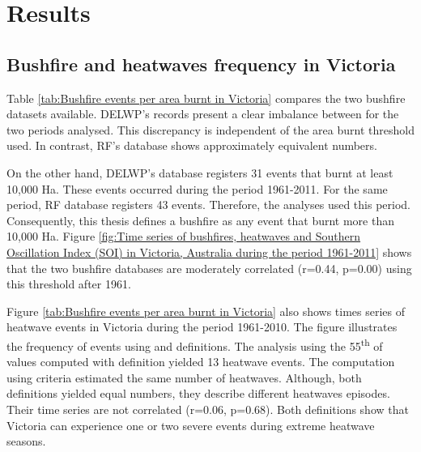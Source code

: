\section{Results}


\subsection{Bushfire and heatwaves frequency in Victoria}

Table \ref{tab:Bushfire events per area burnt in Victoria} compares
the two bushfire datasets available. DELWP's records present a clear
imbalance between for the two periods analysed. This discrepancy is
independent of the area burnt threshold used. In contrast, RF's database
shows approximately equivalent numbers.

On the other hand, DELWP's database registers 31 events that burnt
at least 10,000 Ha. These events occurred during the period 1961-2011.
For the same period, RF database registers 43 events. Therefore, the
analyses used this period. Consequently, this thesis defines a bushfire
as any event that burnt more than 10,000 Ha. Figure \ref{fig:Time series of bushfires, heatwaves and Southern Oscillation Index (SOI) in Victoria, Australia during the period 1961-2011}
shows that the two bushfire databases are moderately correlated (r=0.44,
p=0.00) using this threshold after 1961.

\begin{table}[h]
\caption[Bushfire events per area burnt in Victoria]{Bushfire events per area burnt in Victoria during the season December-January-February
(DJF). Data source: Department of Environment, Land, Water and Planning
(DELWP) and Risk Frontiers (RF). \label{tab:Bushfire events per area burnt in Victoria}}


\noindent \centering{}\noindent{}
\end{table}


Figure \ref{tab:Bushfire events per area burnt in Victoria} also
shows times series of heatwave events in Victoria during the period
1961-2010. The figure illustrates the frequency of events using \citet{Nairn2009}
and \citet{Pezza2012} definitions. The analysis using the 55\textsuperscript{th}
of values computed with \citet{Nairn2009} definition yielded 13 heatwave
events. The computation using \citet{Pezza2012} criteria estimated
the same number of heatwaves. Although, both definitions yielded equal
numbers, they describe different heatwaves episodes. Their time series
are not correlated (r=0.06, p=0.68). Both definitions show that Victoria
can experience one or two severe events during extreme heatwave seasons. 


